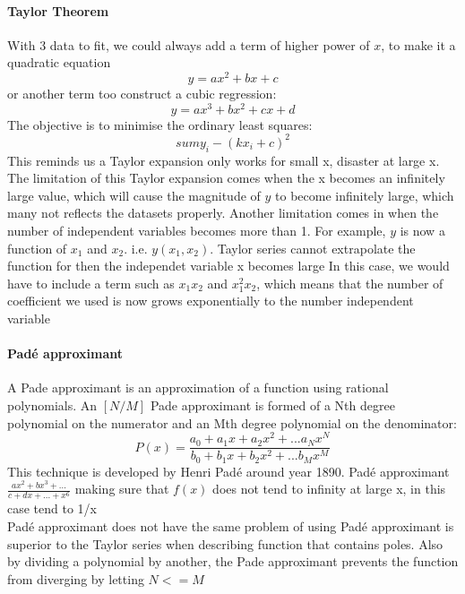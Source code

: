 \documentclass[12pt,a4paper]{article}
\begin{document}
\paragraph{Taylor Theorem}
With 3 data to fit,  we could always add a term of higher power of $x$, to make it a quadratic equation
\begin{equation}
    y= ax^2 +bx+ c
\end{equation}
or another term too construct a cubic regression:
\begin{equation}
    y= ax^3 +bx^2 + cx+d
\end{equation}
The objective is to minimise the ordinary least squares:
\begin{equation}
    sum{y_i-(kx_i+c)}^2
\end{equation}
This reminds us a 
Taylor expansion only works for small x, disaster at large x.
The limitation of this Taylor expansion comes when the x becomes an infinitely large value, which will cause the magnitude of $y$ to become infinitely large, which many not reflects the datasets properly. 
Another limitation comes in when the number of independent variables becomes more than 1. For example, $y$ is now a function of $x_1$ and $x_2$. i.e. $y(x_1,x_2)$.
Taylor series cannot extrapolate the function for then the independet variable x becomes large
In this case, we would have to include a term such as $x_1x_2$ and $x_1^2x_2$, which means that the number of coefficient we used is now grows exponentially to the number independent variable 

\paragraph{Padé approximant}
A Pade approximant is an approximation of a function using rational polynomials.
An $[N/M]$ Pade approximant is formed of a Nth degree polynomial on the numerator and an Mth degree polynomial on the denominator:
\begin{equation}
    P(x)=\frac{a_0+a_1 x+a_2x^2+... a_Nx^N}{b_0+b_1 x+b_2x^2+... b_Mx^M}
\end{equation}
This technique is developed by Henri Padé around year 1890.
Padé approximant $\frac{ax^2+bx^3+...}{c+dx+...+x^6}$ making sure that $f(x)$ does not tend to infinity at large x, in this case tend to 1/x\\
Padé approximant does not have the same problem of using 
Padé approximant is superior to the Taylor series when describing function that contains poles. 
Also by dividing a polynomial by another, the Pade approximant prevents the function from diverging by letting $N<=M$
\end{document}
